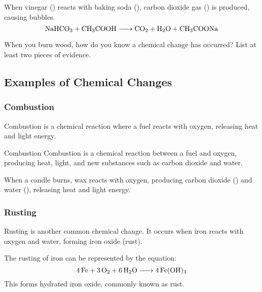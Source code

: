 \begin{example}
When vinegar () reacts with baking soda (), carbon dioxide gas () is produced, causing bubbles.
\[
\ce{NaHCO3 + CH3COOH -> CO2 + H2O + CH3COONa}
\]
\end{example}

\begin{stopandthink}
When you burn wood, how do you know a chemical change has occurred? List at least two pieces of evidence.
\end{stopandthink}

\subsection{Examples of Chemical Changes}

\subsubsection{Combustion}

Combustion is a chemical reaction where a fuel reacts with oxygen, releasing heat and light energy. 

\begin{marginfigure}
\caption{Combustion of wax in a candle flame.}
\label{fig:combustion}
\end{marginfigure}

\begin{keyconcept}{Combustion}
Combustion is a chemical reaction between a fuel and oxygen, producing heat, light, and new substances such as carbon dioxide and water.
\end{keyconcept}

When a candle burns, wax reacts with oxygen, producing carbon dioxide () and water (), releasing heat and light energy.

\subsubsection{Rusting}

Rusting is another common chemical change. It occurs when iron reacts with oxygen and water, forming iron oxide (rust).

\begin{example}
The rusting of iron can be represented by the equation:
\[
\ce{4Fe + 3O2 + 6H2O -> 4Fe(OH)3}
\]
This forms hydrated iron oxide, commonly known as rust.
\end{example}

